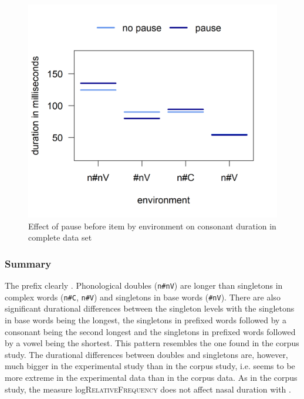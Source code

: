					\begin{figure}
	
	\includegraphics [scale=0.5] {images/Experiment/unModelCompleteInterEnvPause}
	\caption{Effect of pause before item by environment on consonant duration in complete data set}
	\label{fig:NumNasal Pauseun experiment}
\end{figure}
%



\subsubsection{Summary}


The prefix  clearly . Phonological doubles (\texttt{n\#nV})  are longer than singletons in complex words (\texttt{n\#C}, \texttt{n\#V}) and singletons in base words (\texttt{\#nV}). There are also significant durational differences between the singleton levels with the singletons in base words being the longest, the singletons in prefixed words followed by a consonant being the second longest and the singletons in prefixed words followed by a vowel being the shortest. This pattern resembles the one found in the corpus study. The durational differences between doubles and singletons are, however, much bigger in the experimental study than in the corpus study, i.e.  seems to be more extreme in the experimental data than in the corpus data. 
As in the corpus study, the  measure log\textsc{RelativeFrequency} does not affect nasal duration with .



